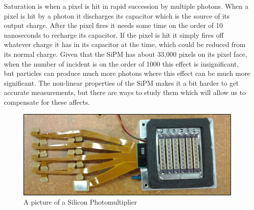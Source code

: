 Saturation is when a pixel is hit in rapid succession by multiple photons. When a pixel is hit by a photon it discharges its capacitor which is the source of its output charge. After the pixel fires it needs some time on the order of 10 nanoseconds to recharge its capacitor. If the pixel is hit it simply fires off whatever charge it has in its capacitor at the time, which could be reduced from its normal charge. Given that the SiPM has about 33,000 pixels on its pixel face, when the number of incident is on the order of 1000 this effect is insignificant, but particles can produce much more photons where this effect can be much more significant. The non-linear properties of the SiPM makes it a bit harder to get accurate measurements, but there are ways to study them which will allow us to compensate for these affects.

\begin{figure}
\centering
\includegraphics[width=\linewidth]{Figures/SiPM.jpg}
\caption{A picture of a Silicon Photomultiplier}
\label{fig:SiPM}
\end{figure}




